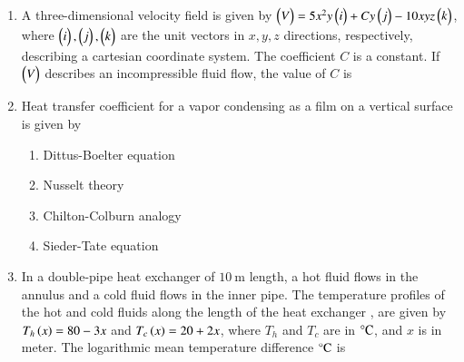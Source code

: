 \documentclass[journal,12pt,onecolumn]{IEEEtran}
\theoremstyle{remark}
\begin{document}
\begin{enumerate}
		\item A three-dimensional velocity field is given by $\begin{pmatrix}V\end{pmatrix} = 5x^2y \begin{pmatrix}i\end{pmatrix} + Cy \begin{pmatrix}j\end{pmatrix} - 10xyz \begin{pmatrix}k\end{pmatrix}$, where $\begin{pmatrix}i\end{pmatrix}, \begin{pmatrix}j\end{pmatrix}, \begin{pmatrix}k\end{pmatrix}$ are the unit vectors in $x, y, z$ directions, respectively, describing a cartesian coordinate system. The coefficient $C$ is a constant. If $\begin{pmatrix}V\end{pmatrix}$ describes an incompressible fluid flow, the value of $C$ is
		
		\hfill{}
		
		\begin{enumerate}
		\end{enumerate}
		
		\item Heat transfer coefficient for a vapor condensing as a film on a vertical surface is given by
		
		\hfill{\brak{\text{GATE CH 2021}}}
		
		\begin{enumerate}
		\item Dittus-Boelter equation
		\item Nusselt theory
		\item Chilton-Colburn analogy
		\item Sieder-Tate equation
		\end{enumerate}
		
		\item In a double-pipe heat exchanger of $10~\text{m}$ length, a hot fluid flows in the annulus and a cold fluid flows in the inner pipe. The temperature profiles of the hot  and cold  fluids along the length of the heat exchanger , are given by $T_h\left(x\right) = 80 - 3x$ and $T_c\left(x\right) = 20 + 2x$, where $T_h$ and $T_c$ are in $\degree\text{C}$, and $x$ is in meter. The logarithmic mean temperature difference  $\degree\text{C}$ is
	
\hfill{}

\begin{enumerate}
\end{enumerate}


\end{enumerate}
\end{document}
